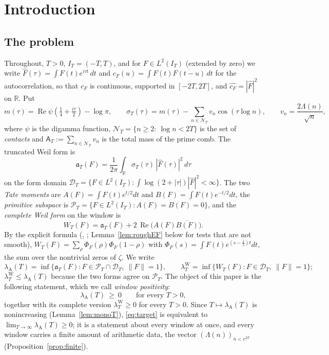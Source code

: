 \documentclass[11pt]{amsart}
\theoremstyle{definition}
\theoremstyle{remark}
\newcommand{\R}{\mathbb R}
\newcommand{\Rel}{\operatorname{Re}}
\newcommand{\PT}{\mathcal P_T}
\newcommand{\IT}{I_T}
\newcommand{\lamW}{\lambda^{\mathrm W}_T}
\newcommand{\lamA}{\lambda_{\mathrm A}(T)}
\newcommand{\sT}{\sigma_T}
\newcommand{\Fh}{\widehat F}
\newcommand{\cF}{c_F}
\newcommand{\NT}{\mathcal N_T}
\newcommand{\Aconst}{\mathsf A_T}
\begin{document}
\maketitle
\tableofcontents

\section{Introduction}\label{sec:intro}

\subsection{The problem}
Throughout, $T>0$, $\IT=(-T,T)$, and for $F\in L^2(\IT)$ (extended by zero) we write
$\Fh(\tau)=\int F(t)e^{i\tau t}\,dt$ and $\cF(u)=\int F(t)\overline{F(t-u)}\,dt$ for the
autocorrelation, so that $\cF$ is continuous, supported in $[-2T,2T]$, and
$\widehat{\cF}=|\Fh|^2$ on $\R$. Put
\begin{equation}\label{eq:symbol}
m(\tau)=\Rel\psi\!\left(\tfrac14+\tfrac{i\tau}{2}\right)-\log\pi,\qquad
\sT(\tau)=m(\tau)-\sum_{n\in\NT}v_n\cos(\tau\log n),\qquad v_n=\frac{2\Lambda(n)}{\sqrt n},
\end{equation}
where $\psi$ is the digamma function, $\NT=\{n\ge2:\ \log n<2T\}$ is the set of \emph{contacts} and
$\Aconst:=\sum_{n\in\NT}v_n$ is the total mass of the prime comb. The truncated Weil form is
\begin{equation}\label{eq:form}
\mathfrak a_T(F)=\frac1{2\pi}\int_\R\sT(\tau)\,|\Fh(\tau)|^2\,d\tau
\end{equation}
on the form domain $\mathcal D_T=\{F\in L^2(\IT):\int\log(2+|\tau|)|\Fh|^2<\infty\}$. The two \emph{Tate
moments} are $A(F)=\int F(t)e^{t/2}dt$ and $B(F)=\int F(t)e^{-t/2}dt$, the \emph{primitive subspace} is
$\PT=\{F\in L^2(\IT):A(F)=B(F)=0\}$, and the \emph{complete Weil form} on the window is
\begin{equation}\label{eq:W}
W_T(F)=\mathfrak a_T(F)+2\,\Rel\big(A(F)\overline{B(F)}\big).
\end{equation}
By the explicit formula (\cite{Weil52}, \cite[Thm.~8.4]{Paper45}; Lemma~\ref{lem:roughEF} below for
tests that are not smooth), $W_T(F)=\sum_\rho\Phi_F(\rho)\Phi_F(1-\rho)$ with
$\Phi_F(s)=\int F(t)e^{(s-\frac12)t}dt$, the sum over the nontrivial zeros of $\zeta$. We write
\[
\lamA=\inf\{\mathfrak a_T(F):F\in\PT\cap\mathcal D_T,\ \|F\|=1\},\qquad
\lamW=\inf\{W_T(F):F\in\mathcal D_T,\ \|F\|=1\};
\]
$\lamW\le\lamA$ because the two forms agree on $\PT$. The object of this paper is the following
statement, which we call \emph{window positivity}:
\begin{equation}\label{eq:target}
\lamA\ \ge\ 0\qquad\text{for every }T>0 ,
\end{equation}
together with its complete version $\lamW\ge0$ for every $T>0$. Since $T\mapsto\lamA$ is nonincreasing
(Lemma~\ref{lem:monoT}), \eqref{eq:target} is equivalent to $\lim_{T\to\infty}\lamA\ge0$; it is a
statement about every window at once, and every window carries a finite amount of arithmetic data, the
vector $(\Lambda(n))_{n<e^{2T}}$ (Proposition~\ref{prop:finite}).
\end{document}
